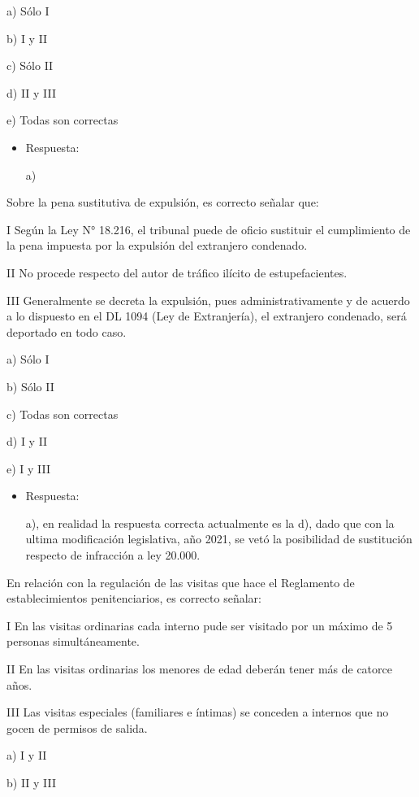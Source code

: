 \documentclass[letterpaper, 11pt]{article}
\begin{document}
a) Sólo I

b) I y II

c) Sólo II

d) II y III

e) Todas son correctas

\begin{itemize}
\item Respuesta:

a)
\end{itemize}


Sobre la pena sustitutiva de expulsión, es correcto señalar que:

I Según la Ley N° 18.216, el tribunal puede de oficio sustituir el
cumplimiento de la pena impuesta por la expulsión del extranjero
condenado.

II No procede respecto del autor de tráfico ilícito de
estupefacientes.

III Generalmente se decreta la expulsión, pues administrativamente y
de acuerdo a lo dispuesto en el DL 1094 (Ley de Extranjería), el
extranjero condenado, será deportado en todo caso.


a) Sólo I

b) Sólo II

c) Todas son correctas

d) I y II

e) I y III

\begin{itemize}
\item Respuesta:

a), en realidad la respuesta correcta actualmente es la d), dado que
con la ultima modificación legislativa, año 2021, se vetó la
posibilidad de sustitución respecto de infracción a ley 20.000.
\end{itemize}


En relación con la regulación de las visitas que hace el Reglamento de
establecimientos penitenciarios, es correcto señalar:


I En las visitas ordinarias cada interno pude ser visitado por un
máximo de 5 personas simultáneamente.

II En las visitas ordinarias los menores de edad deberán tener más de
catorce años.

III Las visitas especiales (familiares e íntimas) se conceden a
internos que no gocen de permisos de salida.



a) I y II

b) II y III
\end{document}
